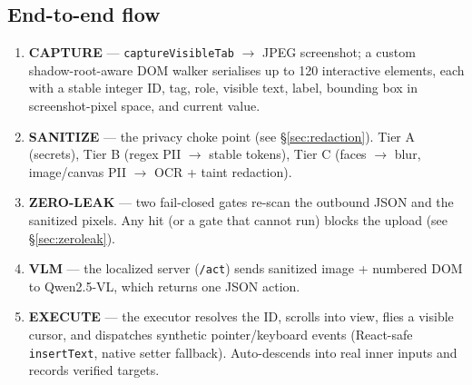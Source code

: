 \documentclass[11pt,a4paper]{article}
\newcommand{\code}[1]{\texttt{#1}}
\begin{document}
\begin{itemize}
\subsection{End-to-end flow}

\begin{center}
\end{center}

\begin{enumerate}
\item \textbf{CAPTURE} --- \code{captureVisibleTab} $\rightarrow$ JPEG screenshot; a custom shadow-root-aware DOM walker serialises up to 120 interactive elements, each with a stable integer ID, tag, role, visible text, label, bounding box in screenshot-pixel space, and current value.
\item \textbf{SANITIZE} --- the privacy choke point (see \S\ref{sec:redaction}). Tier A (secrets), Tier B (regex PII $\rightarrow$ stable tokens), Tier C (faces $\rightarrow$ blur, image/canvas PII $\rightarrow$ OCR + taint redaction).
\item \textbf{ZERO-LEAK} --- two fail-closed gates re-scan the outbound JSON and the sanitized pixels. Any hit (or a gate that cannot run) blocks the upload (see \S\ref{sec:zeroleak}).
\item \textbf{VLM} --- the localized server (\code{/act}) sends sanitized image + numbered DOM to Qwen2.5-VL, which returns one JSON action.
\item \textbf{EXECUTE} --- the executor resolves the ID, scrolls into view, flies a visible cursor, and dispatches synthetic pointer/keyboard events (React-safe \code{insertText}, native setter fallback). Auto-descends into real inner inputs and records verified targets.
\end{enumerate}


\end{itemize}
\end{document}

